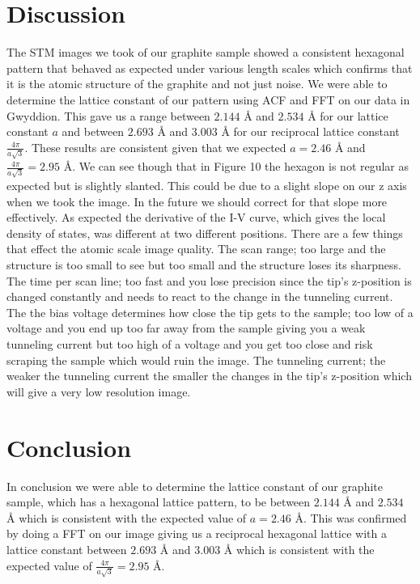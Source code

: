 \documentclass{article}
\begin{document}
\section{Discussion}

The STM images we took of our graphite sample showed a consistent hexagonal pattern that behaved as expected under various length scales which confirms that it is the atomic structure of the graphite and not just noise.  We were able to determine the lattice constant of our pattern using ACF and FFT on our data in Gwyddion.  This gave us a range between $2.144$ {\AA} and $2.534$ {\AA} for our lattice constant $a$ and between $2.693$ {\AA} and $3.003$ {\AA} for our reciprocal lattice constant $\frac{4\pi}{a\sqrt{3}}$.  These results are consistent given that we expected $a=2.46$ {\AA} and $\frac{4\pi}{a\sqrt{3}}=2.95$ {\AA}.  We can see though that in Figure 10 the hexagon is not regular as expected but is slightly slanted.  This could be due to a slight slope on our z axis when we took the image.  In the future we should correct for that slope more effectively. As expected the derivative of the I-V curve, which gives the local density of states, was different at two different positions.
There are a few things that effect the atomic scale image quality. The scan range;  too large and the structure is too small to see but too small and the structure loses its sharpness.  The time per scan line;  too fast and you lose precision since the tip's z-position is changed constantly and needs to react to the change in the tunneling current.  The the bias voltage determines how close the tip gets to the sample;  too low of a voltage and you end up too far away from the sample giving you a weak tunneling current but too high of a voltage and you get too close and risk scraping the sample which would ruin the image.  The tunneling current;  the weaker the tunneling current the smaller the changes in the tip's z-position which will give a very low resolution image.

\section{Conclusion}

In conclusion we were able to determine the lattice constant of our graphite sample, which has a hexagonal lattice pattern, to be  between $2.144$ {\AA} and $2.534$ {\AA} which is consistent with the expected value of $a=2.46$ {\AA}.  This was confirmed by doing a FFT on our image giving us a reciprocal hexagonal lattice with a lattice constant between $2.693$ {\AA} and $3.003$ {\AA} which is consistent with the expected value of $\frac{4\pi}{a\sqrt{3}}=2.95$ {\AA}.   
\end{document}
